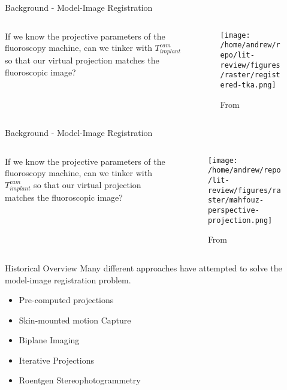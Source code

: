 \documentclass[presentation, aspectratio=1610]{beamer}
\begin{document}
\begin{frame}[label={sec:orgda285d0}]{Background - Model-Image Registration}
\begin{columns}
\begin{column}{0.5\columnwidth}
If we know the projective parameters of the fluoroscopy machine, can we tinker with \(T^{cam}_{implant}\) so that our virtual projection matches the fluoroscopic image?
\end{column}
\begin{column}{0.6\columnwidth}
\begin{figure}[htbp]
\centering
\texttt{[image: /home/andrew/repo/lit-review/figures/raster/registered-tka.png]}
\caption{From \autocite{mahfouzRobustMethodRegistration2003}}
\end{figure}
\end{column}
\end{columns}
\end{frame}
\begin{frame}[label={sec:org4edfb9f}]{Background - Model-Image Registration}
\begin{columns}
\begin{column}{0.5\columnwidth}
If we know the projective parameters of the fluoroscopy machine, can we tinker with \(T^{cam}_{implant}\) so that our virtual projection matches the fluoroscopic image?
\end{column}
\begin{column}{0.6\columnwidth}
\begin{figure}[htbp]
\centering
\texttt{[image: /home/andrew/repo/lit-review/figures/raster/mahfouz-perspective-projection.png]}
\caption{From \autocite{mahfouzRobustMethodRegistration2003}}
\end{figure}
\end{column}
\end{columns}
\end{frame}
\begin{frame}[label={sec:orgc3ab0a7}]{Historical Overview}
Many different approaches have attempted to solve the model-image registration problem.
\begin{itemize}
\item Pre-computed projections
\item Skin-mounted motion Capture
\item Biplane Imaging
\item Iterative Projections
\item Roentgen Stereophotogrammetry
\end{itemize}
\end{frame}
\end{document}
